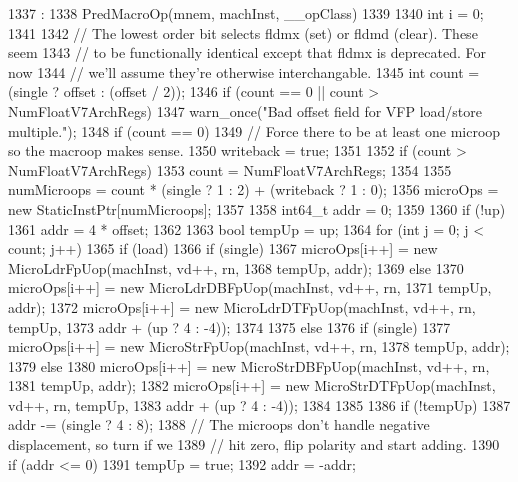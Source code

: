 \begin{DoxyCode}
1337                                                                          :
1338     PredMacroOp(mnem, machInst, __opClass)
1339 {
1340     int i = 0;
1341 
1342     // The lowest order bit selects fldmx (set) or fldmd (clear). These seem
1343     // to be functionally identical except that fldmx is deprecated. For now
1344     // we'll assume they're otherwise interchangable.
1345     int count = (single ? offset : (offset / 2));
1346     if (count == 0 || count > NumFloatV7ArchRegs)
1347         warn_once("Bad offset field for VFP load/store multiple.\n");
1348     if (count == 0) {
1349         // Force there to be at least one microop so the macroop makes sense.
1350         writeback = true;
1351     }
1352     if (count > NumFloatV7ArchRegs)
1353         count = NumFloatV7ArchRegs;
1354 
1355     numMicroops = count * (single ? 1 : 2) + (writeback ? 1 : 0);
1356     microOps = new StaticInstPtr[numMicroops];
1357 
1358     int64_t addr = 0;
1359 
1360     if (!up)
1361         addr = 4 * offset;
1362 
1363     bool tempUp = up;
1364     for (int j = 0; j < count; j++) {
1365         if (load) {
1366             if (single) {
1367                 microOps[i++] = new MicroLdrFpUop(machInst, vd++, rn,
1368                                                   tempUp, addr);
1369             } else {
1370                 microOps[i++] = new MicroLdrDBFpUop(machInst, vd++, rn,
1371                                                     tempUp, addr);
1372                 microOps[i++] = new MicroLdrDTFpUop(machInst, vd++, rn, tempUp,
1373                                                     addr + (up ? 4 : -4));
1374             }
1375         } else {
1376             if (single) {
1377                 microOps[i++] = new MicroStrFpUop(machInst, vd++, rn,
1378                                                   tempUp, addr);
1379             } else {
1380                 microOps[i++] = new MicroStrDBFpUop(machInst, vd++, rn,
1381                                                     tempUp, addr);
1382                 microOps[i++] = new MicroStrDTFpUop(machInst, vd++, rn, tempUp,
1383                                                     addr + (up ? 4 : -4));
1384             }
1385         }
1386         if (!tempUp) {
1387             addr -= (single ? 4 : 8);
1388             // The microops don't handle negative displacement, so turn if we
1389             // hit zero, flip polarity and start adding.
1390             if (addr <= 0) {
1391                 tempUp = true;
1392                 addr = -addr;
}}}}
\end{DoxyCode}
